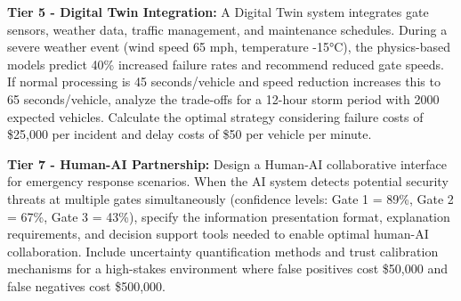 \documentclass{article}
\begin{document}
\textbf{Tier 5 - Digital Twin Integration:}
A Digital Twin system integrates gate sensors, weather data, traffic management, and maintenance schedules. During a severe weather event (wind speed 65 mph, temperature -15°C), the physics-based models predict 40\% increased failure rates and recommend reduced gate speeds. If normal processing is 45 seconds/vehicle and speed reduction increases this to 65 seconds/vehicle, analyze the trade-offs for a 12-hour storm period with 2000 expected vehicles. Calculate the optimal strategy considering failure costs of \$25,000 per incident and delay costs of \$50 per vehicle per minute.

\textbf{Tier 7 - Human-AI Partnership:}
Design a Human-AI collaborative interface for emergency response scenarios. When the AI system detects potential security threats at multiple gates simultaneously (confidence levels: Gate 1 = 89\%, Gate 2 = 67\%, Gate 3 = 43\%), specify the information presentation format, explanation requirements, and decision support tools needed to enable optimal human-AI collaboration. Include uncertainty quantification methods and trust calibration mechanisms for a high-stakes environment where false positives cost \$50,000 and false negatives cost \$500,000.
\end{document}
